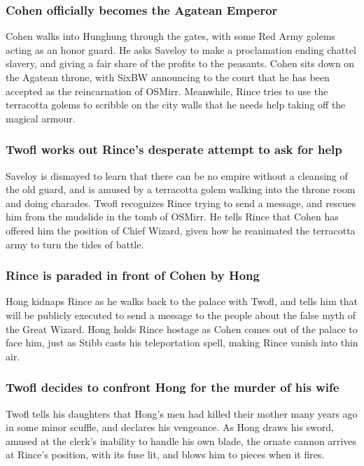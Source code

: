\subsubsection{\Gls{Cohen} officially becomes the Agatean Emperor}
\Gls{Cohen} walks into Hunghung through the gates, with some Red Army golems acting as an honor
guard. He asks \Gls{Saveloy} to make a proclamation ending chattel slavery, and giving a fair share
of the profits to the peasants. \Gls{Cohen} sits down on the Agatean throne, with \Gls{SixBW}
announcing to the court that he has been accepted as the reincarnation of \Gls{OSMirr}. Meanwhile,
\Gls{Rince} tries to use the terracotta golems to scribble on the city walls that he needs help
taking off the magical armour.

\subsubsection{\Gls{Twofl} works out \Gls{Rince}'s desperate attempt to ask for help}
\Gls{Saveloy} is dismayed to learn that there can be no empire without a cleansing of the old guard,
and is amused by a terracotta golem walking into the throne room and doing charades. \Gls{Twofl}
recognizes \Gls{Rince} trying to send a message, and rescues him from the mudslide in the tomb of
\Gls{OSMirr}. He tells \Gls{Rince} that \Gls{Cohen} has offered him the position of Chief Wizard,
given how he reanimated the terracotta army to turn the tides of battle.

\subsubsection{\Gls{Rince} is paraded in front of \Gls{Cohen} by \Gls{Hong}}
\Gls{Hong} kidnaps \Gls{Rince} as he walks back to the palace with \Gls{Twofl}, and tells him that
will be publicly executed to send a message to the people about the false myth of the Great Wizard.
\Gls{Hong} holds \Gls{Rince} hostage as \Gls{Cohen} comes out of the palace to face him, just as
\Gls{Stibb} casts his teleportation spell, making \Gls{Rince} vanish into thin air.

\subsubsection{\Gls{Twofl} decides to confront \Gls{Hong} for the murder of his wife}
\Gls{Twofl} tells his daughters that \Gls{Hong}'s men had killed their mother many years ago in some
minor scuffle, and declares his vengeance. As \Gls{Hong} draws his sword, amused at the clerk's
inability to handle his own blade, the ornate cannon arrives at \Gls{Rince}'s position, with its
fuse lit, and blows him to pieces when it fires.

